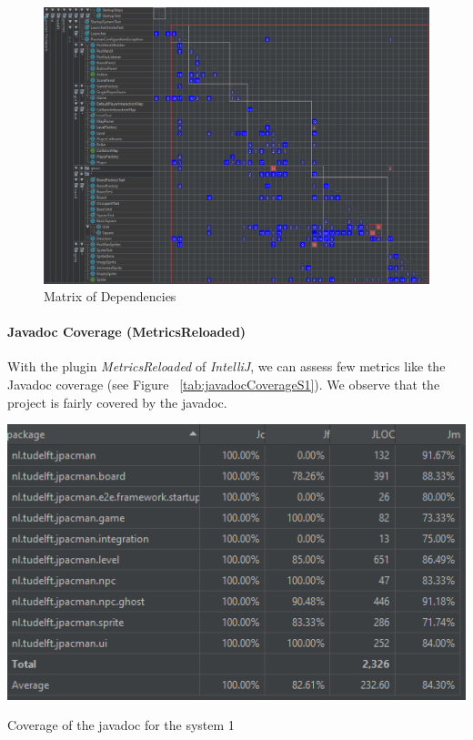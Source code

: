 \documentclass{article}
\begin{document}
\begin{figure}
    \centering
    \includegraphics[width=\linewidth]{imgs/matrix dependencies.PNG}
    \caption{Matrix of Dependencies}
    \label{fig:DependenciesMatrixS1}
\end{figure}

\paragraph{Javadoc Coverage (MetricsReloaded)}

With the plugin \textit{MetricsReloaded} of \textit{IntelliJ}, we can assess few metrics like the Javadoc coverage (see Figure ~\ref{tab:javadocCoverageS1}). We observe that the project is fairly covered by the javadoc.

\begin{table}
    \centering
    \includegraphics[width=\linewidth]{imgs/JavaDocCoverageS1.PNG}
    \caption{Coverage of the javadoc for the system 1}
    \label{tab:javadocCoverageS1}
\end{table}
\end{document}
